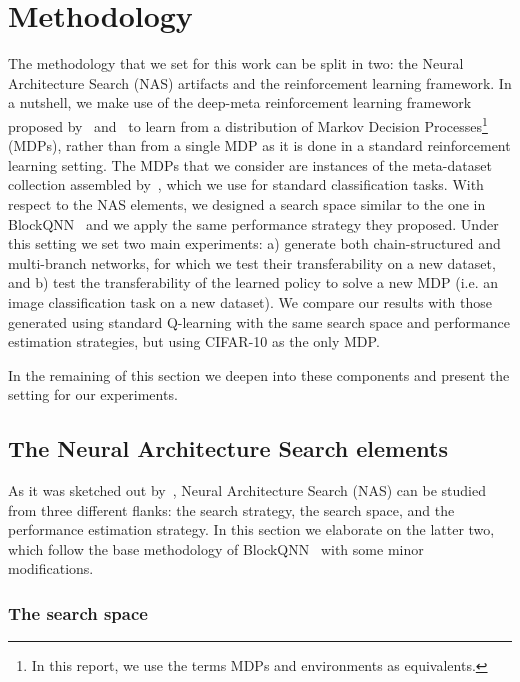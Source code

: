 \section{Methodology}\label{sec:methodology}

The methodology that we set for this work can be split in two: the Neural Architecture Search (NAS) artifacts and the reinforcement learning framework. 
In a nutshell, we make use of the deep-meta reinforcement learning framework proposed by~\citet{LtRL} and~\citet{RL2} to learn from a distribution of Markov Decision Processes\footnote{In this report, we use the terms MDPs and environments as equivalents.} (MDPs), rather than from a single MDP as it is done in a standard reinforcement learning setting. The MDPs that we consider are instances of the meta-dataset collection assembled by~\citet{MetaDataset}, which we use for standard classification tasks. With respect to the NAS elements, we designed a search space similar to the one in BlockQNN~\citep{BlockQNN} and we apply the same performance strategy they proposed. Under this setting we set two main experiments: a) generate both chain-structured and multi-branch networks, for which we test their transferability on a new dataset, and b) test the transferability of the learned policy to solve a new MDP (i.e. an image classification task on a new dataset). We compare our results with those generated using standard Q-learning with the same search space and performance estimation strategies, but using CIFAR-10 as the only MDP.

In the remaining of this section we deepen into these components and present the setting for our experiments.

\subsection{The Neural Architecture Search elements}\label{sec:methodology:nas}

As it was sketched out by~\cite{NASsurvey}, Neural Architecture Search (NAS) can be studied from three different flanks: the search strategy, the search space, and the performance estimation strategy. In this section we elaborate on the latter two, which follow the base methodology of BlockQNN~\citep{BlockQNN} with some minor modifications.

\subsubsection{The search space}\label{sec:methodology:ss}

